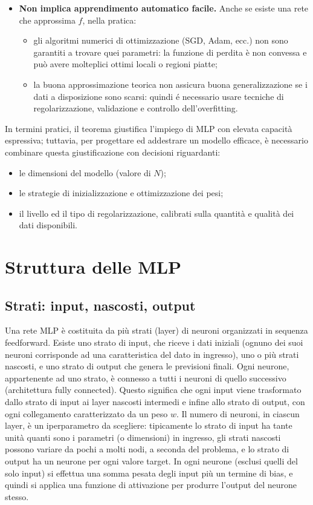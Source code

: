 \documentclass[a4paper,12pt]{report}
\begin{document}
\begin{itemize}
		\item \textbf{Non implica apprendimento automatico facile.} Anche se esiste una rete che approssima \(f\), nella pratica:
		\begin{itemize}
			\item gli algoritmi numerici di ottimizzazione (SGD, Adam, ecc.) non sono garantiti a trovare quei parametri: la funzione di perdita è non convessa e può avere molteplici ottimi locali o regioni piatte;
			\item la buona approssimazione teorica non assicura buona generalizzazione se i dati a disposizione sono scarsi: quindi é necessario usare tecniche di regolarizzazione, validazione e controllo dell'overfitting.
		\end{itemize}
	\end{itemize}
	
	In termini pratici, il teorema giustifica l'impiego di MLP con elevata capacità espressiva; tuttavia, per progettare ed addestrare un modello efficace, è necessario combinare questa giustificazione con decisioni riguardanti:
	\begin{itemize}
		\item le dimensioni del modello (valore di \(N\));
		\item le strategie di inizializzazione e ottimizzazione dei pesi;
		\item il livello ed il tipo di regolarizzazione, calibrati sulla quantità e qualità dei dati disponibili.
	\end{itemize}
	
	\section{Struttura delle MLP}
	
	\subsection{Strati: input, nascosti, output}
	Una rete MLP è costituita da più strati (layer) di neuroni organizzati in sequenza feedforward. Esiste uno strato di input, che riceve i dati iniziali (ognuno dei suoi neuroni corrisponde ad una caratteristica del dato in ingresso), uno o più strati nascosti, e uno strato di output che genera le previsioni finali. Ogni neurone, appartenente ad uno strato, è connesso a tutti i neuroni di quello successivo (architettura fully connected). Questo significa che ogni input viene trasformato dallo strato di input ai layer nascosti intermedi e infine allo strato di output, con ogni collegamento caratterizzato da un peso $w$. Il numero di neuroni, in ciascun layer, è un iperparametro da scegliere: tipicamente lo strato di input ha tante unità quanti sono i parametri (o dimensioni) in ingresso, gli strati nascosti possono variare da pochi a molti nodi, a seconda del problema, e lo strato di output ha un neurone per ogni valore target. In ogni neurone (esclusi quelli del solo input) si effettua una somma pesata degli input più un termine di bias, e quindi si applica una funzione di attivazione per produrre l’output del neurone stesso.
	
\end{document}
